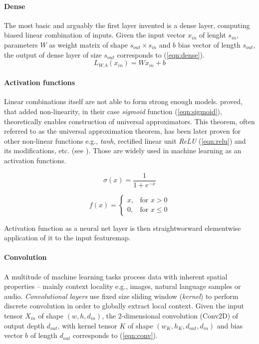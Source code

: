 \paragraph{Dense}
The most basic and arguably the first layer invented is a dense layer, computing biased linear combination of inputs. Given the input vector $x_{in}$ of lenght $s_{in}$, parameters $W$ as weight matrix of shape $s_{out} \times s_{in}$ and $b$ bias vector of length $s_{out}$, the output of dense layer of size $s_{out}$ corresponds to (\ref{eqn:dense}).
\begin{equation} \label{eqn:dense}
L_{W, b}\left(x_{in}\right) = W x_{in} + b
\end{equation}

\paragraph{Activation functions}
Linear combinations itself are not able to form strong enough models. \cite{Cybenko1989} proved, that added non-linearity, in their case \emph{sigmoid} function (\ref{eqn:sigmoid}), theoretically enables construction of universal approximators. This theorem, often referred to as the universal approximation theorem, has been later proven for other non-linear functions e.g., \emph{tanh}, rectified linear unit \emph{ReLU} (\ref{eqn:relu}) and its modifications, etc. (see \cite{DBLP:journals/corr/SonodaM15}). Those are widely used in machine learning as an activation functions.

\begin{equation} \label{eqn:sigmoid}
\sigma(x) = \frac{1}{1 + e^{-x}}
\end{equation}

\begin{equation} \label{eqn:relu}
f(x) =
\begin{cases}
    x, & \text{for } x > 0 \\
    0, & \text{for } x \leq 0
\end{cases}
\end{equation}

\noindent Activation function as a neural net layer is then straightworward elementwise application of it to the input featuremap.

\paragraph{Convolution}
A multitude of machine learning tasks process data with inherent spatial properties -- mainly context locality e.g., images, natural language samples or audio. \emph{Convolutional layers} use fixed size sliding window (\emph{kernel}) to perform discrete convolution in order to globally extract local context. Given the input tensor $X_{in}$ of shape $(w, h, d_{in})$, the 2-dimensional convolution (Conv2D) of output depth $d_{out}$, with kernel tensor $K$ of shape $(w_K, h_K, d_{out}, d_{in})$ and bias vector $b$ of length $d_{out}$ corresponds to (\ref{eqn:conv}).


